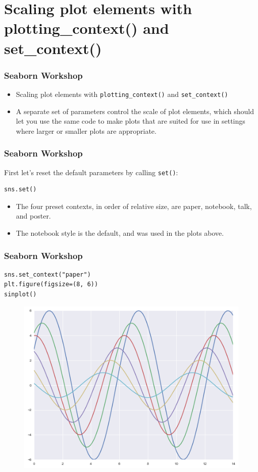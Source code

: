 \documentclass{beamer}
\begin{document}
\section{Scaling plot elements with plotting\_context() and set\_context()}
\begin{frame}[fragile]
	\frametitle{Seaborn Workshop}
	\large
	\begin{itemize}
\item Scaling plot elements with \texttt{plotting\_context()} and \texttt{set\_context()}
\item A separate set of parameters control the scale of plot elements, which should let you use the same code to make plots that are suited for use in settings where larger or smaller plots are appropriate.
	\end{itemize}

\end{frame}
\begin{frame}[fragile]
	\frametitle{Seaborn Workshop}
	\large
First let’s reset the default parameters by calling \texttt{set()}:
\begin{verbatim}
sns.set()
\end{verbatim}
\begin{itemize}
\item The four preset contexts, in order of relative size, are paper, notebook, talk, and poster.
\item The notebook style is the default, and was used in the plots above.
\end{itemize}

\end{frame}
\begin{frame}[fragile]
	\frametitle{Seaborn Workshop}
	\large
\begin{verbatim}
sns.set_context("paper")
plt.figure(figsize=(8, 6))
sinplot()
\end{verbatim}

\begin{figure}
	\centering
	\includegraphics[width=0.7\linewidth]{images/aesthetics_35_0}
\end{figure}


\end{frame}
\end{document}
